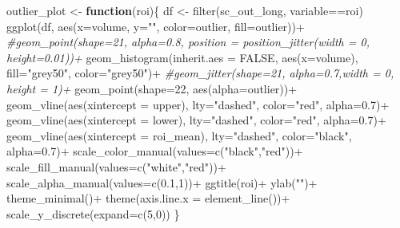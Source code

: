 \documentclass[
]{article}
\newenvironment{Shaded}{\begin{snugshade}}{\end{snugshade}}
\newcommand{\AttributeTok}[1]{\textcolor[rgb]{0.77,0.63,0.00}{#1}}
\newcommand{\CommentTok}[1]{\textcolor[rgb]{0.56,0.35,0.01}{\textit{#1}}}
\newcommand{\ConstantTok}[1]{\textcolor[rgb]{0.00,0.00,0.00}{#1}}
\newcommand{\ControlFlowTok}[1]{\textcolor[rgb]{0.13,0.29,0.53}{\textbf{#1}}}
\newcommand{\DecValTok}[1]{\textcolor[rgb]{0.00,0.00,0.81}{#1}}
\newcommand{\FloatTok}[1]{\textcolor[rgb]{0.00,0.00,0.81}{#1}}
\newcommand{\FunctionTok}[1]{\textcolor[rgb]{0.00,0.00,0.00}{#1}}
\newcommand{\NormalTok}[1]{#1}
\newcommand{\OtherTok}[1]{\textcolor[rgb]{0.56,0.35,0.01}{#1}}
\newcommand{\SpecialCharTok}[1]{\textcolor[rgb]{0.00,0.00,0.00}{#1}}
\newcommand{\StringTok}[1]{\textcolor[rgb]{0.31,0.60,0.02}{#1}}
\begin{document}
\begin{Shaded}
\begin{Highlighting}[]
\NormalTok{outlier\_plot }\OtherTok{\textless{}{-}} \ControlFlowTok{function}\NormalTok{(roi)\{}
\NormalTok{  df }\OtherTok{\textless{}{-}} \FunctionTok{filter}\NormalTok{(sc\_out\_long, variable}\SpecialCharTok{==}\NormalTok{roi)}
  \FunctionTok{ggplot}\NormalTok{(df, }\FunctionTok{aes}\NormalTok{(}\AttributeTok{x=}\NormalTok{volume, }\AttributeTok{y=}\StringTok{""}\NormalTok{, }\AttributeTok{color=}\NormalTok{outlier, }\AttributeTok{fill=}\NormalTok{outlier))}\SpecialCharTok{+}
  \CommentTok{\#geom\_point(shape=21, alpha=0.8, position = position\_jitter(width = 0, height=0.01))+}
  \FunctionTok{geom\_histogram}\NormalTok{(}\AttributeTok{inherit.aes =} \ConstantTok{FALSE}\NormalTok{, }\FunctionTok{aes}\NormalTok{(}\AttributeTok{x=}\NormalTok{volume), }\AttributeTok{fill=}\StringTok{"grey50"}\NormalTok{, }\AttributeTok{color=}\StringTok{"grey50"}\NormalTok{)}\SpecialCharTok{+}
  \CommentTok{\#geom\_jitter(shape=21, alpha=0.7,width = 0, height = 1)+}
  \FunctionTok{geom\_point}\NormalTok{(}\AttributeTok{shape=}\DecValTok{22}\NormalTok{, }\FunctionTok{aes}\NormalTok{(}\AttributeTok{alpha=}\NormalTok{outlier))}\SpecialCharTok{+}
  \FunctionTok{geom\_vline}\NormalTok{(}\FunctionTok{aes}\NormalTok{(}\AttributeTok{xintercept =}\NormalTok{ upper), }\AttributeTok{lty=}\StringTok{"dashed"}\NormalTok{, }\AttributeTok{color=}\StringTok{"red"}\NormalTok{, }\AttributeTok{alpha=}\FloatTok{0.7}\NormalTok{)}\SpecialCharTok{+}
  \FunctionTok{geom\_vline}\NormalTok{(}\FunctionTok{aes}\NormalTok{(}\AttributeTok{xintercept =}\NormalTok{ lower), }\AttributeTok{lty=}\StringTok{"dashed"}\NormalTok{, }\AttributeTok{color=}\StringTok{"red"}\NormalTok{, }\AttributeTok{alpha=}\FloatTok{0.7}\NormalTok{)}\SpecialCharTok{+}
  \FunctionTok{geom\_vline}\NormalTok{(}\FunctionTok{aes}\NormalTok{(}\AttributeTok{xintercept =}\NormalTok{ roi\_mean), }\AttributeTok{lty=}\StringTok{"dashed"}\NormalTok{, }\AttributeTok{color=}\StringTok{"black"}\NormalTok{, }\AttributeTok{alpha=}\FloatTok{0.7}\NormalTok{)}\SpecialCharTok{+}
  \FunctionTok{scale\_color\_manual}\NormalTok{(}\AttributeTok{values=}\FunctionTok{c}\NormalTok{(}\StringTok{"black"}\NormalTok{,}\StringTok{"red"}\NormalTok{))}\SpecialCharTok{+}
  \FunctionTok{scale\_fill\_manual}\NormalTok{(}\AttributeTok{values=}\FunctionTok{c}\NormalTok{(}\StringTok{"white"}\NormalTok{,}\StringTok{"red"}\NormalTok{))}\SpecialCharTok{+}
  \FunctionTok{scale\_alpha\_manual}\NormalTok{(}\AttributeTok{values=}\FunctionTok{c}\NormalTok{(}\FloatTok{0.1}\NormalTok{,}\DecValTok{1}\NormalTok{))}\SpecialCharTok{+}
  \FunctionTok{ggtitle}\NormalTok{(roi)}\SpecialCharTok{+}
  \FunctionTok{ylab}\NormalTok{(}\StringTok{""}\NormalTok{)}\SpecialCharTok{+}
  \FunctionTok{theme\_minimal}\NormalTok{()}\SpecialCharTok{+}
  \FunctionTok{theme}\NormalTok{(}\AttributeTok{axis.line.x =} \FunctionTok{element\_line}\NormalTok{())}\SpecialCharTok{+} 
  \FunctionTok{scale\_y\_discrete}\NormalTok{(}\AttributeTok{expand=}\FunctionTok{c}\NormalTok{(}\DecValTok{5}\NormalTok{,}\DecValTok{0}\NormalTok{))}
\NormalTok{\}}


\end{Highlighting}
\end{Shaded}
\end{document}
